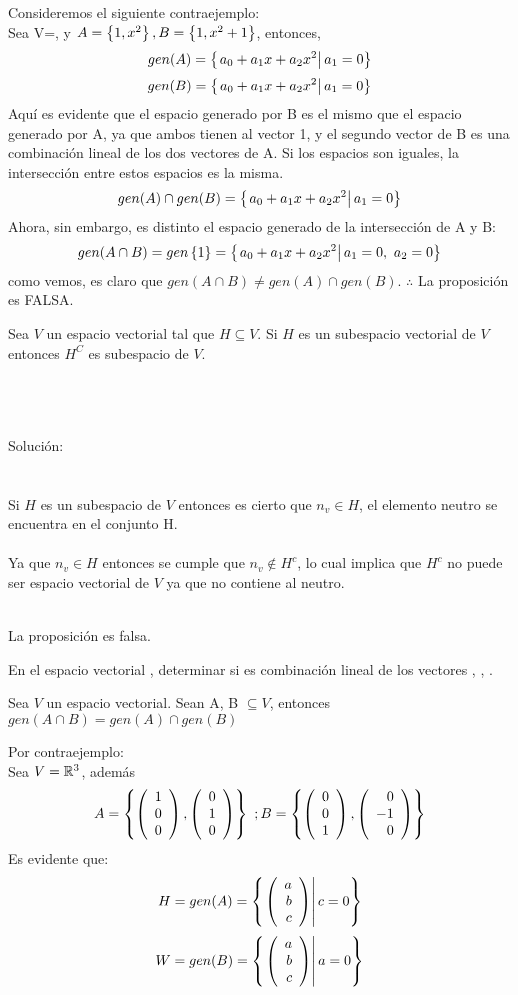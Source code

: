 \begin{enumerate}
Consideremos el siguiente contraejemplo:~\\
Sea V=\pdos, y $A= \left\{1,x^2 \right\} , B= \left\{1,x^2+1 \right\} $, entonces,
\[gen(A)=\left\{ \left. a_0+a_1x+a_2x^2\right| a_1=0 \right\}\]
\[gen(B)=\left\{ \left. a_0+a_1x+a_2x^2\right| a_1=0 \right\}\]
Aqu\'i es evidente que el espacio generado por B es el mismo que el espacio generado por A, ya que ambos tienen al vector 1, y el segundo vector de B es una combinación lineal de los dos vectores de A.
Si los espacios son iguales, la intersecci\'on entre estos espacios es la misma.
\[gen(A)\cap gen(B)=\left\{ \left. a_0+a_1x+a_2x^2\right| a_1=0 \right\}\]
Ahora, sin embargo, es distinto el espacio generado de la intersecci\'on de A y B:
\[gen(A\cap B)=gen \left\{1 \right\} =\left\{ \left. a_0+a_1x+a_2x^2\right| a_1=0,\ a_2=0 \right\}\]
como vemos, es claro que $gen(A\cap B)\neq gen(A)\cap gen(B)$. $\therefore$ La proposici\'on es FALSA.

\newpage
\begin{prop}


Sea $V$ un espacio vectorial tal que $H\subseteq V$. Si $H$ es un subespacio vectorial de $V$ entonces $H^C$ es subespacio de $V$.

\end{prop}
~\\~\\~\\
Solución:
~\\
~\\~\\
Si $H$ es un subespacio de $V$ entonces es cierto que $n_v \in H$, el elemento neutro se encuentra en el conjunto H.~\\
~\\
Ya que $n_v \in H$ entonces se cumple que $n_v \notin H^c$, lo cual implica que $H^c$ no puede ser espacio vectorial de $V$ ya que no contiene al neutro.
 
~\\
La proposición es falsa.

\newpage
\newpage


\begin{prob}[]
En el espacio vectorial \mdosxdos, determinar si 
 es combinación lineal de los vectores 
, , .
\end{prob}

\newpage

\begin{prop}
Sea $V$ un espacio vectorial. Sean A, B $\subseteq V$, entonces $gen(A\cap B)=gen(A)\cap gen(B)$
\end{prop}
\sol
Por contraejemplo:
~\\
Sea $V=\mathbb{R}^3$, además~\\
\[A=\left\lbrace \left( \begin{array}{r} 1\\ 0\\ 0 \end{array} \right) , \left( \begin{array}{r} 0\\ 1\\ 0 \end{array} \right)  \right\rbrace\  ;  B=\left\lbrace \left( \begin{array}{r} 0\\ 0\\ 1 \end{array} \right) , \left( \begin{array}{r} 0\\ -1\\ 0 \end{array} \right)  \right\rbrace\]
Es evidente que:~\\
\[H=gen(A)=\left\{ \left. \left( \begin{array}{r} a\\ b\\ c \end{array} \right) \right| c=0 \right\}\]
\[W=gen(B)=\left\{ \left. \left( \begin{array}{r} a\\ b\\ c \end{array} \right) \right| a=0 \right\}\]



\end{enumerate}
